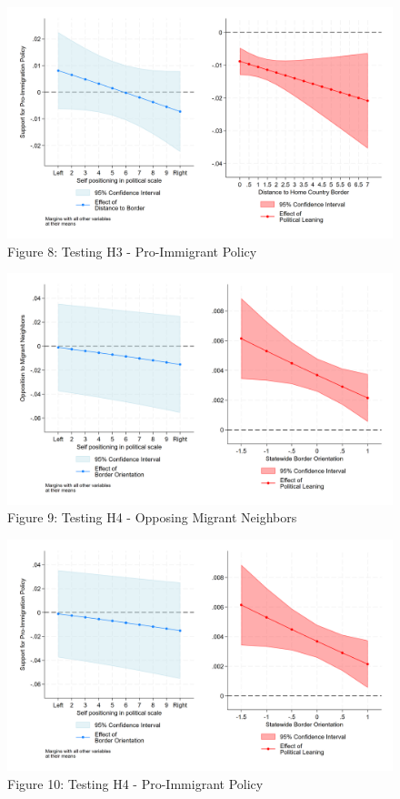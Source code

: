 \documentclass[12pt,]{article}
\begin{document}
\begin{figure}
\centering
\includegraphics{figures/m5_policy_marginal_1.png}
\caption{Figure 8: Testing H3 - Pro-Immigrant Policy}
\end{figure}

\begin{figure}
\centering
\includegraphics{figures/m6_marginal_1.png}
\caption{Figure 9: Testing H4 - Opposing Migrant Neighbors}
\end{figure}

\begin{figure}
\centering
\includegraphics{figures/m6_policy_marginal_1.png}
\caption{Figure 10: Testing H4 - Pro-Immigrant Policy}
\end{figure}
\end{document}

